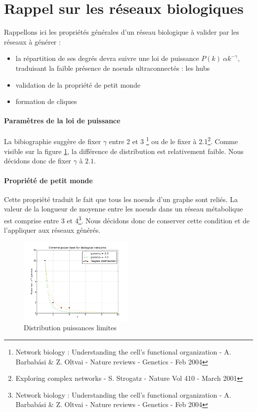 \section{Rappel sur les réseaux biologiques}

Rappellons ici les propriétés générales d'un réseau biologique à valider par les réseaux à générer :
\begin{itemize}
	\item la répartition de ses degrés devra suivre une loi de puissance $ P(k) ~ \alpha k^{-\gamma} $, traduisant la faible présence de noeuds ultraconnectés : les hubs
	\item validation de la propriété de \og petit monde\fg
	\item formation de cliques 
\end{itemize}

\paragraph*{Paramètres de la loi de puissance\\}
La bibiographie suggère de fixer $\gamma $ entre 2 et 3 \footnote{Network biology : Understanding the cell's functional organization - A. Barbab\'{a}si \& Z. Oltvai - Nature reviews - Genetics - Feb 2004} ou de le fixer à 2.1\footnote{Exploring complex networks - S. Strogatz - Nature Vol 410 - March 2001}. Comme visible sur la figure \ref{scalefree}, la différence de distribution est relativement faible. Nous décidons donc de fixer $\gamma$ à $2.1$.


\paragraph*{Propriété de petit monde \\}
Cette propriété traduit le fait que tous les noeuds d'un graphe sont reliés. La valeur de la longueur de moyenne entre les noeuds dans un réseau métabolique est comprise entre 3 et 4\footnote{Network biology : Understanding the cell's functional organization - A. Barbab\'{a}si \& Z. Oltvai - Nature reviews - Genetics - Feb 2004}. Nous décidons donc de conserver cette condition et de l'appliquer aux réseaux générés.

\begin{figure}
  \begin{center}
    \includegraphics[width=0.50\textwidth]{Plot.png}
  \end{center}
  \caption{Distribution puissances limites}
  \label{scalefree}
\end{figure}
